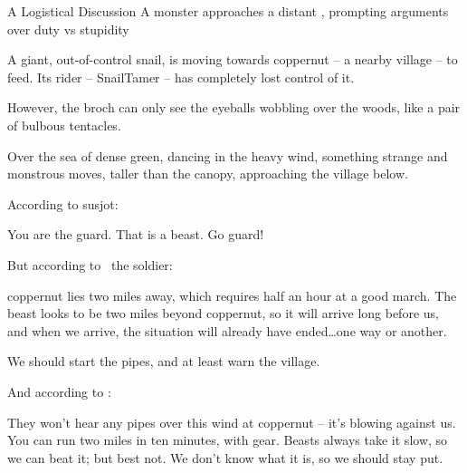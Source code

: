 \renewcommand\csComments{
  \draw[very thick,gray] (12,0.6) -- (13,0.6) node[anchor=north]{\outline{1 Mile}} -- (17,0.6) node[anchor=north]{\outline{5 Miles}} ;
}




{A Logistical Discussion}%
{A monster approaches a distant , prompting arguments over duty vs stupidity}%

A giant, out-of-control snail, is moving towards \gls{coppernut} -- a nearby \gls{village} -- to feed.
Its rider -- \gls{SnailTamer} -- has completely lost control of it.

However, the \gls{broch} can only see the eyeballs wobbling over the woods, like a pair of bulbous tentacles.

\begin{boxtext}
  Over the sea of dense green, dancing in the heavy wind, something strange and monstrous moves, taller than the canopy, approaching the \gls{village} below.
\end{boxtext}

According to \gls{susjot}:

\begin{speechtext}
  You are the \gls{guard}.
  That is a beast.
  Go guard!
\end{speechtext}

But according to \composeHumanName\ the \gls{soldier}:

\begin{speechtext}
  \Gls{coppernut} lies two miles away, which requires half an hour at a good march.
  The beast looks to be two miles beyond \gls{coppernut}, so it will arrive long before us, and when we arrive, the situation will already have ended\ldots one way or another.

  We should start the pipes, and at least warn the \gls{village}.
\end{speechtext}

And according to :

\begin{speechtext}
  They won't hear any pipes over this wind at \gls{coppernut} -- it's blowing against us.
  You can run two miles in ten minutes, with gear.
  Beasts always take it slow, so we can beat it; but best not.
  We don't know what it is, so we should stay put.
\end{speechtext}

